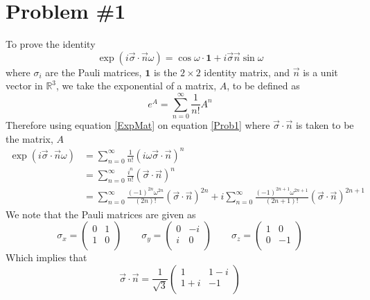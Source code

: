 \documentclass[11pt]{article}
\numberwithin{equation}{section}
\begin{document}


\section{Problem \#1}
To prove the identity
\begin{equation}
\exp(i\vec{\sigma}\cdot\vec{n}\omega)=\cos\omega\cdot\mathbf{1}+i\vec{\sigma}\vec{n}\sin\omega
\label{Prob1}
\end{equation}
where $\sigma_i$ are the Pauli matrices, $\mathbf{1}$ is the $2\times2$ identity matrix, and 
$\vec{n}$ is a unit vector in $\mathbb{R}^3$, we take the exponential of a matrix, $A$, to be 
defined as
\begin{equation}
e^{A} = \sum_{n=0}^{\infty}\frac{1}{n!}A^n
\label{ExpMat}
\end{equation}
Therefore using equation \ref{ExpMat} on equation \ref{Prob1} where $\vec{\sigma}\cdot\vec{n}$
is taken to be the matrix, $A$
\begin{align*}
\exp(i\vec{\sigma}\cdot\vec{n}\omega) &= \sum_{n=0}^{\infty}\frac{1}{n!}(i\omega\vec{\sigma}\cdot\vec{n})^n\\
&= \sum_{n=0}^{\infty}\frac{i^n}{n!}(\vec{\sigma}\cdot\vec{n})^n\\
&= \sum_{n=0}^{\infty}\frac{(-1)^{2n}\omega^{2n}}{(2n)!}(\vec{\sigma}\cdot\vec{n})^{2n} + i\sum_{n=0}^{\infty}\frac{(-1)^{2n+1}\omega^{2n+1}}{(2n+1)!}(\vec{\sigma}\cdot\vec{n})^{2n+1}
\end{align*}
We note that the Pauli matrices are given as
$$\sigma_x = \left(\begin{array}{cc}
               0     &1\\
               1     &0\\
             \end{array}\right)\qquad
\sigma_y = \left(\begin{array}{cc}
               0     &-i\\
               i     &0\\
             \end{array}\right)\qquad
\sigma_z = \left(\begin{array}{cc}
               1     &0\\
               0     &-1\\
             \end{array}\right)$$
Which implies that
$$\vec{\sigma}\cdot\vec{n} = \frac{1}{\sqrt{3}}\left(\begin{array}{cc}
                                   1     &1-i\\
                                   1+i  &-1\\
                                 \end{array}\right)$$
\end{document}
